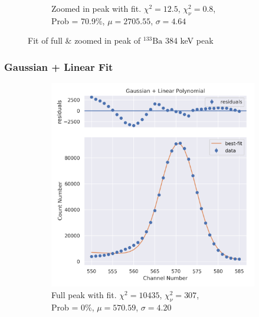 \documentclass[11pt,a4paper]{article}
\newcommand{\element}[2]{$^{#2}\textrm{#1}$}
\begin{document}
\begin{figure}[H]
\begin{subfigure}{.5\linewidth}
    \caption{Zoomed in peak with fit. $\chi^2 = 12.5$, $\chi^2_\nu = 0.8$, \\ Prob = 70.9\%, $\mu = 2705.55$, $\sigma = 4.64$}
  \end{subfigure}
  \caption{Fit of full \& zoomed in peak of \element{Ba}{133} 384 keV peak}
\end{figure}
\clearpage
\subsubsection{Gaussian + Linear Fit}
\begin{figure}[H]
  \centering
  \begin{subfigure}{.5\linewidth}
    \centering
    \includegraphics[width=\linewidth]{./Images/Barium133/Linear/Linear_1_Full.png}
    \caption{Full peak with fit. $\chi^2 = 10435$, $\chi^2_\nu = 307$, \\ Prob = 0\%, $\mu = 570.59$, $\sigma = 4.20$}
  \end{subfigure}%
  \begin{subfigure}{.5\linewidth}
    \centering

\end{subfigure}
\end{figure}
\end{document}
